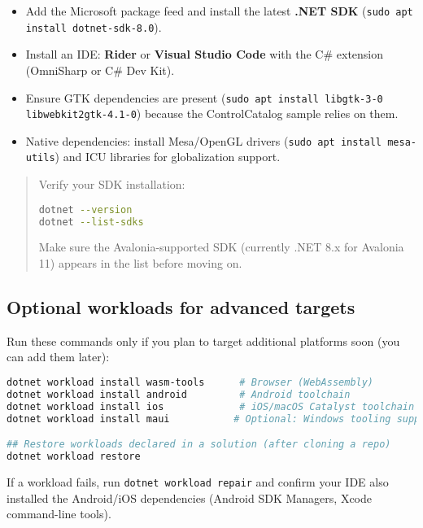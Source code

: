 \begin{itemize}
\tightlist
\item
  Add the Microsoft package feed and install the latest \textbf{.NET
  SDK} (\passthrough{\lstinline!sudo apt install dotnet-sdk-8.0!}).
\item
  Install an IDE: \textbf{Rider} or \textbf{Visual Studio Code} with the
  C\# extension (OmniSharp or C\# Dev Kit).
\item
  Ensure GTK dependencies are present
  (\passthrough{\lstinline!sudo apt install libgtk-3-0 libwebkit2gtk-4.1-0!})
  because the ControlCatalog sample relies on them.
\item
  Native dependencies: install Mesa/OpenGL drivers
  (\passthrough{\lstinline!sudo apt install mesa-utils!}) and ICU
  libraries for globalization support.
\end{itemize}

\begin{quote}
Verify your SDK installation:

\begin{lstlisting}[language=bash]
dotnet --version
dotnet --list-sdks
\end{lstlisting}

Make sure the Avalonia-supported SDK (currently .NET 8.x for Avalonia
11) appears in the list before moving on.
\end{quote}

\subsection{Optional workloads for advanced
targets}\label{optional-workloads-for-advanced-targets}

Run these commands only if you plan to target additional platforms soon
(you can add them later):

\begin{lstlisting}[language=bash]
dotnet workload install wasm-tools      # Browser (WebAssembly)
dotnet workload install android         # Android toolchain
dotnet workload install ios             # iOS/macOS Catalyst toolchain
dotnet workload install maui           # Optional: Windows tooling support

## Restore workloads declared in a solution (after cloning a repo)
dotnet workload restore
\end{lstlisting}

If a workload fails, run
\passthrough{\lstinline!dotnet workload repair!} and confirm your IDE
also installed the Android/iOS dependencies (Android SDK Managers, Xcode
command-line tools).

